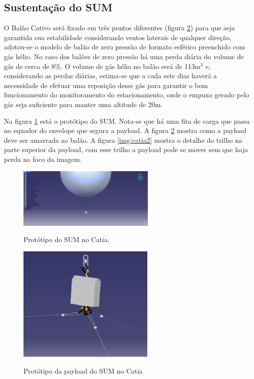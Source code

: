 \subsection{Sustentação do SUM}

O Balão Cativo será fixado em três pontos diferentes (figura \ref{img:catiaPayload}) para que seja garantida sua estabilidade considerando ventos laterais de qualquer direção, adotou-se o modelo de balão de zero pressão de formato esférico preenchido com gás hélio. No caso dos balões de zero pressão há uma perda diária do volume de gás de cerca de 8\%. O volume de gás hélio no balão será de 113m$^{3}$ e, considerando as perdas diárias, estima-se que a cada sete dias haverá a necessidade de  efetuar uma reposição desse gás para garantir o bom funcionamento do monitoramento do estacionamento, onde o empuxo gerado pelo gás seja suficiente para manter uma altitude de 20m.

	Na figura \ref{img:catia1} está o protótipo do SUM. Nota-se que há uma fita de carga que passa no equador do envelope que segura a payload. A figura \ref{img:catiaPayload} mostra como a payload deve ser amarrada ao balão. A figura \ref{img:catia2} mostra o detalhe do trilho na parte superior da payload, com esse trilho a payload pode se mover sem que haja perda no foco da imagem.

	\begin{figure}[htp]
		\centering
		\caption{Protótipo do SUM no Catia.}
		\includegraphics[width=0.6\textwidth]{figuras/catia1}
		\label{img:catia1}
	\end{figure}

	\begin{figure}[htp]
		\centering
		\caption{Protótipo da payload do SUM no Catia}
		\includegraphics[width=0.6\textwidth]{figuras/catiadopayload}
		\label{img:catiaPayload}
	\end{figure}

